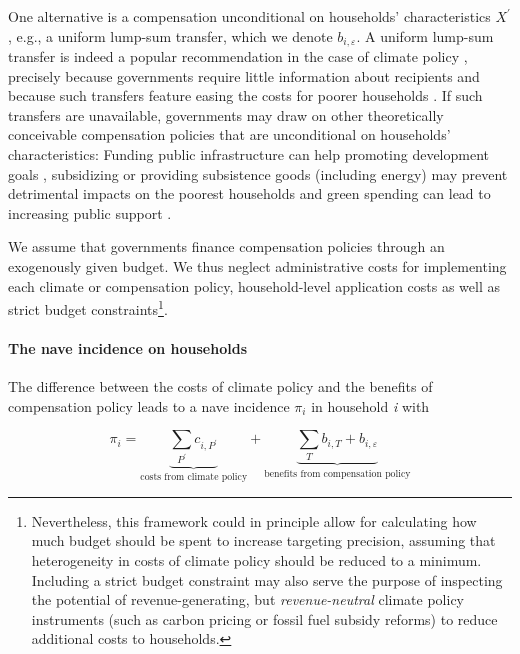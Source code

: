 \documentclass[12pt, a4paper]{article}
\begin{document}
One alternative is a compensation unconditional on households' characteristics $X^{\prime}$, e.g., a uniform lump-sum transfer, which we denote $b_{i,\varepsilon}$. A uniform lump-sum transfer is indeed a popular recommendation in the case of climate policy \autocite{Stiglitz.2017,Baranzini.2000,Metcalf.2009,Sager.2023}, precisely because governments require little information about recipients and because such transfers feature easing the costs for poorer households \autocite{Budolfson.2021,vanderPloeg.2022}. If such transfers are unavailable, governments may draw on other theoretically conceivable compensation policies that are unconditional on households' characteristics: Funding public infrastructure can help promoting development goals \autocite{Franks.2018,Jakob.2016}, subsidizing or providing subsistence goods (including energy) may prevent detrimental impacts on the poorest households \autocite{Greve.2022,Schaffitzel.2019} and green spending can lead to increasing public support \autocite{Sommer.2022,Kotchen.2017,Dechezlepretre.2022}.

We assume that governments finance compensation policies through an exogenously given budget. We thus neglect administrative costs for implementing each climate or compensation policy, household-level application costs as well as strict budget constraints\footnote{Nevertheless, this framework could in principle allow for calculating how much budget should be spent to increase targeting precision, assuming that heterogeneity in costs of climate policy should be reduced to a minimum. Including a strict budget constraint may also serve the purpose of inspecting the potential of revenue-generating, but \textit{revenue-neutral} climate policy instruments (such as carbon pricing or fossil fuel subsidy reforms) to reduce additional costs to households.}. 

\paragraph{The nave incidence on households}
The difference between the costs of climate policy and the benefits of compensation policy leads to a nave incidence $\pi_{i}$ in household \textit{i} with

\begin{equation} \label{eq:pi}
    \pi_{i} = \underbrace{\sum_{P^{\prime}} c_{i,P^{\prime}}}_{\text{costs from climate policy}} + \underbrace{\sum_{T} b_{i,T} + b_{i,\varepsilon}}_{\text{benefits from compensation policy}}
\end{equation}
\end{document}
